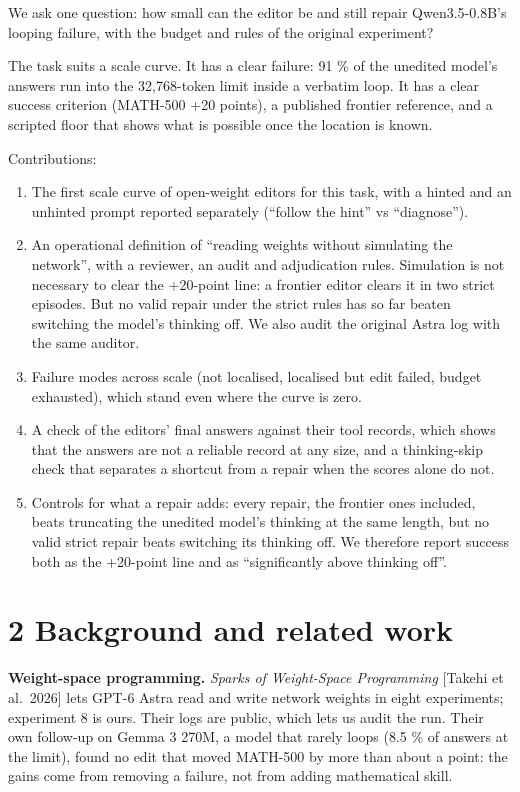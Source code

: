\documentclass[
  10pt,
]{article}
\providecommand{\tightlist}{%
  \setlength{\itemsep}{0pt}\setlength{\parskip}{0pt}}
\begin{document}
We ask one question: how small can the editor be and still repair
Qwen3.5-0.8B's looping failure, with the budget and rules of the
original experiment?

The task suits a scale curve. It has a clear failure: 91 \% of the
unedited model's answers run into the 32,768-token limit inside a
verbatim loop. It has a clear success criterion (MATH-500 +20 points), a
published frontier reference, and a scripted floor that shows what is
possible once the location is known.

Contributions:

\begin{enumerate}
\def\labelenumi{\arabic{enumi}.}
\tightlist
\item
  The first scale curve of open-weight editors for this task, with a
  hinted and an unhinted prompt reported separately (``follow the hint''
  vs ``diagnose'').
\item
  An operational definition of ``reading weights without simulating the
  network'', with a reviewer, an audit and adjudication rules.
  Simulation is not necessary to clear the +20-point line: a frontier
  editor clears it in two strict episodes. But no valid repair under the
  strict rules has so far beaten switching the model's thinking off. We
  also audit the original Astra log with the same auditor.
\item
  Failure modes across scale (not localised, localised but edit failed,
  budget exhausted), which stand even where the curve is zero.
\item
  A check of the editors' final answers against their tool records,
  which shows that the answers are not a reliable record at any size,
  and a thinking-skip check that separates a shortcut from a repair when
  the scores alone do not.
\item
  Controls for what a repair adds: every repair, the frontier ones
  included, beats truncating the unedited model's thinking at the same
  length, but no valid strict repair beats switching its thinking off.
  We therefore report success both as the +20-point line and as
  ``significantly above thinking off''.
\end{enumerate}

\section{2 Background and related
work}\label{background-and-related-work}

\textbf{Weight-space programming.} \emph{Sparks of Weight-Space
Programming} {[}Takehi et al.~2026{]} lets GPT-6 Astra read and write
network weights in eight experiments; experiment 8 is ours. Their logs
are public, which lets us audit the run. Their own follow-up on Gemma 3
270M, a model that rarely loops (8.5 \% of answers at the limit), found
no edit that moved MATH-500 by more than about a point: the gains come
from removing a failure, not from adding mathematical skill.
\end{document}
